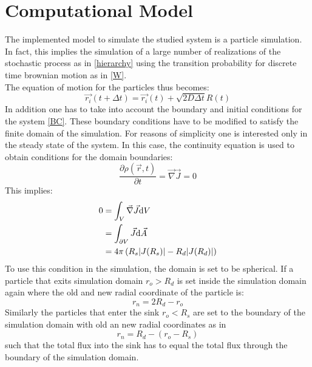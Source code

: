 \section{Computational Model}

The implemented model to simulate the studied system is a particle simulation. In fact, this implies the simulation of a large number of realizations of the stochastic process as in \eqref{hierarchy} using the transition probability for discrete time brownian motion as in \eqref{W}.\\
The equation of motion for the particles thus becomes:
\begin{equation}
    \vec{r_i}(t + \Delta t) = \vec{r_i}(t) + \sqrt{2 D \Delta t}R(t)
    \label{computational eqm}
\end{equation}
In addition one has to take into account the boundary and initial conditions for the system \eqref{BC}. These boundary conditions have to be modified to satisfy the finite domain of the simulation.
For reasons of simplicity one is interested only in the steady state of the system.
In this case, the continuity equation is used to obtain conditions for the domain boundaries:
\begin{equation}
    \frac{\partial \rho(\vec{r},t)}{\partial t} = \vec{\nabla} \vec{J} = 0
\end{equation}
This implies:
\begin{align}
    0   &= \int_V \vec{\nabla}\vec{J} {\rm d} V \nonumber \\
    &= \int_{\partial V} \vec{J} {\rm d} \vec{A} \nonumber \\
    &= 4 \pi \left( R_s |J(R_s)| - R_d |J(R_d)| \right)
\end{align}
To use this condition in the simulation, the domain is set to be spherical. If a particle that exits simulation domain $r_o > R_d$ is set inside the simulation domain again where the old and new radial coordinate of the particle is:
\begin{equation}
    r_n = 2 R_d - r_o
\end{equation}
Similarly the particles that enter the sink $r_o < R_s$ are set to the boundary of the simulation domain with old an new radial coordinates as in 
\begin{equation}
    r_n = R_d - (r_o - R_s)
\end{equation}
such that the total flux into the sink has to equal the total flux through the boundary of the simulation domain.


